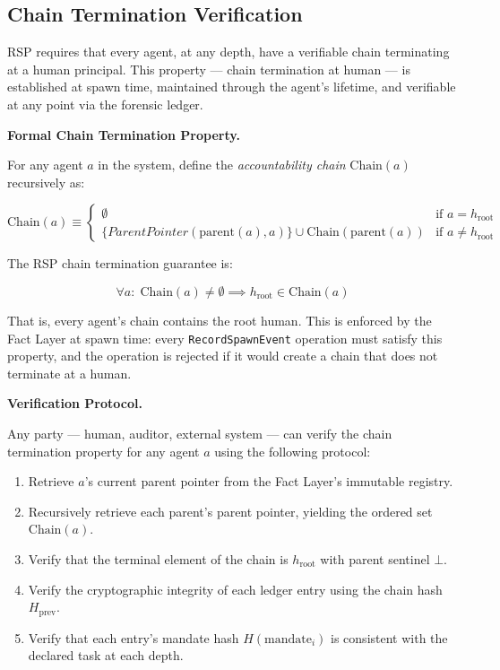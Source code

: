 \subsection{Chain Termination Verification}

RSP requires that every agent, at any depth, have a verifiable chain terminating at a human principal. This property — chain termination at human — is established at spawn time, maintained through the agent's lifetime, and verifiable at any point via the forensic ledger.

\bigskip
\noindent\textbf{Formal Chain Termination Property.}

For any agent $a$ in the system, define the \emph{accountability chain} $\text{Chain}(a)$ recursively as:

\begin{equation}
    \text{Chain}(a) \equiv 
    \begin{cases}
        \emptyset & \text{if } a = h_{\text{root}} \\
        \{ ParentPointer(\text{parent}(a), a) \} \cup \text{Chain}(\text{parent}(a)) & \text{if } a \neq h_{\text{root}}
    \end{cases}
\end{equation}

The RSP chain termination guarantee is:

\begin{equation}
    \forall a:\; \text{Chain}(a) \neq \emptyset \implies h_{\text{root}} \in \text{Chain}(a)
\end{equation}

That is, every agent's chain contains the root human. This is enforced by the Fact Layer at spawn time: every \texttt{RecordSpawnEvent} operation must satisfy this property, and the operation is rejected if it would create a chain that does not terminate at a human.

\bigskip
\noindent\textbf{Verification Protocol.}

Any party — human, auditor, external system — can verify the chain termination property for any agent $a$ using the following protocol:

\begin{enumerate}
    \item Retrieve $a$'s current parent pointer from the Fact Layer's immutable registry.
    \item Recursively retrieve each parent's parent pointer, yielding the ordered set $\text{Chain}(a)$.
    \item Verify that the terminal element of the chain is $h_{\text{root}}$ with parent sentinel $\bot$.
    \item Verify the cryptographic integrity of each ledger entry using the chain hash $H_{\text{prev}}$.
    \item Verify that each entry's mandate hash $H(\text{mandate}_i)$ is consistent with the declared task at each depth.
\end{enumerate}

